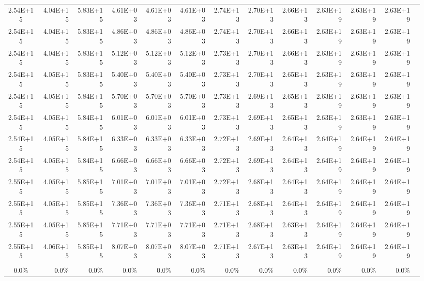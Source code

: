 \documentclass{article}
\begin{document}
\begin{table}
\begin{tabular}{crrr|rrr|rrr|rrr}
2.54E+15   & 4.04E+15   & 5.83E+15   & 4.61E+03   & 4.61E+03   & 4.61E+03   & 2.74E+13   & 2.70E+13   & 2.66E+13   & 2.63E+19   & 2.63E+19   & 2.63E+19   \\
2.54E+15   & 4.04E+15   & 5.83E+15   & 4.86E+03   & 4.86E+03   & 4.86E+03   & 2.74E+13   & 2.70E+13   & 2.66E+13   & 2.63E+19   & 2.63E+19   & 2.63E+19   \\
2.54E+15   & 4.04E+15   & 5.83E+15   & 5.12E+03   & 5.12E+03   & 5.12E+03   & 2.73E+13   & 2.70E+13   & 2.66E+13   & 2.63E+19   & 2.63E+19   & 2.63E+19   \\
2.54E+15   & 4.05E+15   & 5.83E+15   & 5.40E+03   & 5.40E+03   & 5.40E+03   & 2.73E+13   & 2.70E+13   & 2.65E+13   & 2.63E+19   & 2.63E+19   & 2.63E+19   \\
2.54E+15   & 4.05E+15   & 5.84E+15   & 5.70E+03   & 5.70E+03   & 5.70E+03   & 2.73E+13   & 2.69E+13   & 2.65E+13   & 2.63E+19   & 2.63E+19   & 2.63E+19   \\
2.54E+15   & 4.05E+15   & 5.84E+15   & 6.01E+03   & 6.01E+03   & 6.01E+03   & 2.73E+13   & 2.69E+13   & 2.65E+13   & 2.63E+19   & 2.63E+19   & 2.63E+19   \\
2.54E+15   & 4.05E+15   & 5.84E+15   & 6.33E+03   & 6.33E+03   & 6.33E+03   & 2.72E+13   & 2.69E+13   & 2.64E+13   & 2.64E+19   & 2.64E+19   & 2.64E+19   \\
2.54E+15   & 4.05E+15   & 5.84E+15   & 6.66E+03   & 6.66E+03   & 6.66E+03   & 2.72E+13   & 2.69E+13   & 2.64E+13   & 2.64E+19   & 2.64E+19   & 2.64E+19   \\
2.55E+15   & 4.05E+15   & 5.85E+15   & 7.01E+03   & 7.01E+03   & 7.01E+03   & 2.72E+13   & 2.68E+13   & 2.64E+13   & 2.64E+19   & 2.64E+19   & 2.64E+19   \\
2.55E+15   & 4.05E+15   & 5.85E+15   & 7.36E+03   & 7.36E+03   & 7.36E+03   & 2.71E+13   & 2.68E+13   & 2.64E+13   & 2.64E+19   & 2.64E+19   & 2.64E+19   \\
2.55E+15   & 4.05E+15   & 5.85E+15   & 7.71E+03   & 7.71E+03   & 7.71E+03   & 2.71E+13   & 2.68E+13   & 2.63E+13   & 2.64E+19   & 2.64E+19   & 2.64E+19   \\
2.55E+15   & 4.06E+15   & 5.85E+15   & 8.07E+03   & 8.07E+03   & 8.07E+03   & 2.71E+13   & 2.67E+13   & 2.63E+13   & 2.64E+19   & 2.64E+19   & 2.64E+19   \\
           &            &            &            &            &            &            &            &            &            &            &            \\ \hline
0.0\%      & 0.0\%      & 0.0\%      & 0.0\%      & 0.0\%      & 0.0\%      & 0.0\%      & 0.0\%      & 0.0\%      & 0.0\%      & 0.0\%      & 0.0\%      \\

\end{tabular}
\end{table}
\end{document}
